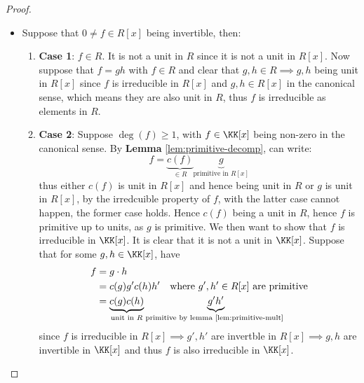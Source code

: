 \begin{proof}
	\leavevmode
	\begin{itemize}
		\item Suppose that \( 0 \ne f \in R[x] \) being invertible, then:
		      \begin{enumerate}
			      \item \textbf{Case 1}: \( f \in R \). It is not a unit in \( R \) since it is not a unit
			            in \( R[x] \). Now suppose that \( f = gh \) with \( f \in R \) and clear that \(
			            g,h \in R \implies g,h\) being unit in \( R[x] \) since \( f \) is irreducible in
			            \( R[x] \) and \( g,h \in R[x] \) in the canonical sense, which means they are
			            also unit in \( R \), thus \( f \) is irreducible as elements in \( R \).
			      \item \textbf{Case 2}: Suppose \( \deg(f) \geq 1 \), with \( f \in \KK[x] \) being
			            non-zero in the canonical sense. By \textbf{Lemma}
			            \ref{lem:primitive-decomp}, can write:
			            \[
				            f = \underbrace{c(f)}_{\in R} \underbrace{g}_{\text{primitive in } R[x]}
			            \]
			            thus either \( c(f) \) is unit in \( R[x] \) and hence being unit in \( R \) or \(
			            g\) is unit in \( R[x] \), by the irredcuible property of \( f \), with the latter
			            case cannot happen, the former case holds. Hence \( c(f) \) being a unit in \( R \),
			            hence \( f \) is primitive up to units, as \( g \) is primitive. We then want to
			            show that \( f \) is irreducible in \( \KK[x] \). It is clear that it is not a
			            unit in \( \KK[x] \). Suppose that for some \( g,h \in \KK[x] \), have
			            \[
				            \begin{aligned}
					            f & = g\cdot h                                                                 \\
					              & = c(g) g' c(h) h' \quad \text{where } g',h' \in R[x] \text{ are primitive}
					            \\
					              & = \underbrace{c(g) c(h)}_{\text{unit in } R} \underbrace{g'
						            h'}_{\text{primitive by lemma \ref{lem:primitive-mult} }}
				            \end{aligned}
			            \]
			            since \( f \) is irreducible in \( R[x] \implies g',h' \) are invertble in \( R[x]
			            \implies g,h \) are invertible in \( \KK[x] \) and thus \( f \) is also
			            irreducible in \( \KK[x] \).

\end{enumerate}
\end{itemize}
\end{proof}
